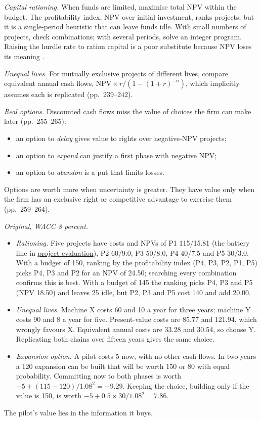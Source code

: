 \begin{qfmethod}
\emph{Capital rationing.} When funds are limited, maximise total NPV within the budget. The profitability index, NPV over initial investment, ranks projects, but it is a single-period heuristic that can leave funds idle. With small numbers of projects, check combinations; with several periods, solve an integer program. Raising the hurdle rate to ration capital is a poor substitute because NPV loses its meaning \citep[pp.~228--236]{applied-corporate-finance-2014}.

\emph{Unequal lives.} For mutually exclusive projects of different lives, compare equivalent annual cash flows, $\mathrm{NPV}\times r/(1-(1+r)^{-n})$, which implicitly assumes each is replicated (pp.~239--242).

\emph{Real options.} Discounted cash flows miss the value of choices the firm can make later (pp.~255--265):
\begin{itemize}
\item an option to \emph{delay} gives value to rights over negative-NPV projects;
\item an option to \emph{expand} can justify a first phase with negative NPV;
\item an option to \emph{abandon} is a put that limits losses.
\end{itemize}
Options are worth more when uncertainty is greater. They have value only when the firm has an exclusive right or competitive advantage to exercise them (pp.~259--264).

 \emph{Original, WACC 8 percent.}
\begin{itemize}
\item \emph{Rationing.} Five projects have costs and NPVs of P1 115/15.81 (the battery line in \hyperref[meth:capital-project-evaluation]{project evaluation}), P2 60/9.0, P3 50/8.0, P4 40/7.5 and P5 30/3.0. With a budget of 150, ranking by the profitability index (P4, P3, P2, P1, P5) picks P4, P3 and P2 for an NPV of 24.50; searching every combination confirms this is best. With a budget of 145 the ranking picks P4, P3 and P5 (NPV 18.50) and leaves 25 idle, but P2, P3 and P5 cost 140 and add 20.00.
\item \emph{Unequal lives.} Machine X costs 60 and 10 a year for three years; machine Y costs 90 and 8 a year for five. Present-value costs are 85.77 and 121.94, which wrongly favours X. Equivalent annual costs are 33.28 and 30.54, so choose Y. Replicating both chains over fifteen years gives the same choice.
\item \emph{Expansion option.} A pilot costs 5 now, with no other cash flows. In two years a 120 expansion can be built that will be worth 150 or 80 with equal probability. Committing now to both phases is worth $-5+(115-120)/1.08^2=-9.29$. Keeping the choice, building only if the value is 150, is worth $-5+0.5\times30/1.08^2=7.86$.
\end{itemize}
The pilot's value lies in the information it buys.


\end{qfmethod}
